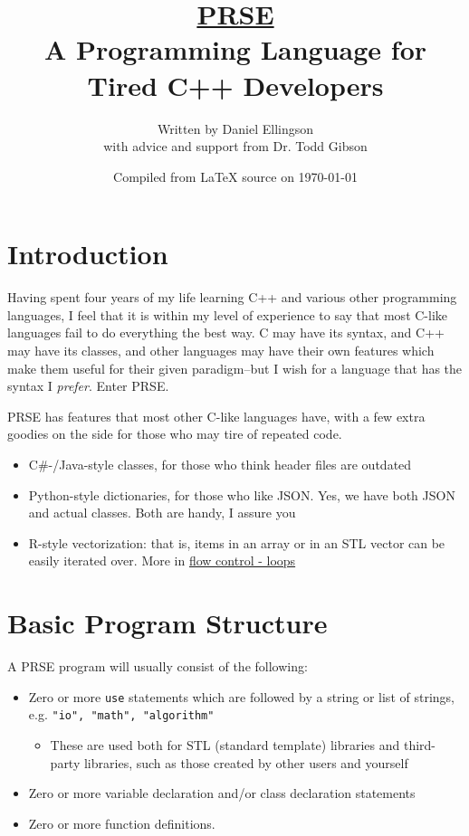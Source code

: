 \documentclass[letterpaper, 12pt]{article}
\begin{document}
\title{\underline{PRSE}\\ A Programming Language for Tired C++ Developers}
\author{Written by Daniel Ellingson\\with advice and support from Dr. Todd Gibson}
\date{Compiled from {\LaTeX} source on \today}
\maketitle

\newpage

\tableofcontents

\newpage

\section{Introduction}
Having spent four years of my life learning C++ and various other programming languages, I feel that
it is within my level of experience to say that most C-like languages fail to do everything the best
way. C may have its syntax, and C++ may have its classes, and other languages may have their own
features which make them useful for their given paradigm--but I wish for a language that has the
syntax I {\em prefer}. Enter PRSE.\linebreak

PRSE has features that most other C-like languages have, with a few extra goodies on the side for
those who may tire of repeated code.

\begin{itemize}
\item C\#-/Java-style classes, for those who think header files are outdated
\item Python-style dictionaries, for those who like JSON. Yes, we have both JSON and actual classes.
   Both are handy, I assure you
\item R-style vectorization: that is, items in an array or in an STL vector can be easily iterated
   over. More in \hyperref[sec:flowcontrol-loops]{flow control - loops}
\end{itemize}

\newpage

\section{Basic Program Structure}

A PRSE program will usually consist of the following:

\begin{itemize}
\item Zero or more \texttt{use} statements which are followed by a string or list of strings, e.g. \texttt{"io", "math", "algorithm"}
\begin{itemize}
   \item These are used both for STL (standard template) libraries and third-party libraries, such as those created by other users and yourself
\end{itemize}
\item Zero or more variable declaration and/or class declaration statements
\item Zero or more function definitions. 
\end{itemize}
\end{document}
